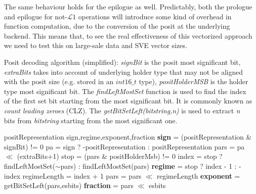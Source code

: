 The same behaviour holds for the epilogue as well.
Predictably, both the prologue and epilogue for not-$\mathcal{L}1$ operations will introduce some kind of overhead in function computation, due to the conversion of the posit at the underlying backend. This means that, to see the real effectiveness of this vectorized approach we need to test this on large-sale data and SVE vector sizes.



\begin{algorithm}
 \caption{Posit decoding algorithm (simplified): \textit{signBit} is the posit most significant bit, \textit{extraBits} takes into account of underlying holder type that may not be aligned with the posit size (e.g.  stored in an $int16\_t$ type), \textit{positHolderMSB} is the holder type most significant bit. The \textit{findLeftMostSet} function is used to find the index of the first set bit starting from the most significant bit. It is commonly known as \textit{count leading zeroes} (CLZ). The \textit{getBitSetLeft(bitstring,n)} is used to extract \textit{n} bits from \textit{bitstring} starting from the most significant one.}
 \label{alg:positdec}
 \begin{algorithmic}[1]
 \renewcommand{\algorithmicrequire}{\textbf{Input:}}
 \renewcommand{\algorithmicensure}{\textbf{Output:}}
 \Require positRepresentation
 \Ensure sign,regime,exponent,fraction
    \State \textbf{sign} = (positRepresentation \& signBit) != 0
    \State pa = sign ? -positRepresentation : positRepresentation
    \State pars = pa $\ll$ (extraBits+1)
    \State stop = (pars \& positHolderMsb) != 0
    \State index = stop ? findLeftMostSet($\sim$pars) : findLeftMostSet(pars)
    \State \textbf{regime} = stop ? index - 1 : -index
    \State regimeLength = index + 1
    \State pars = pars $\ll$ regimeLength
    \State \textbf{exponent} = getBitSetLeft(pars,esbits)
    \State \textbf{fraction} = pars $\ll$ esbits 
\end{algorithmic} 
\end{algorithm}


